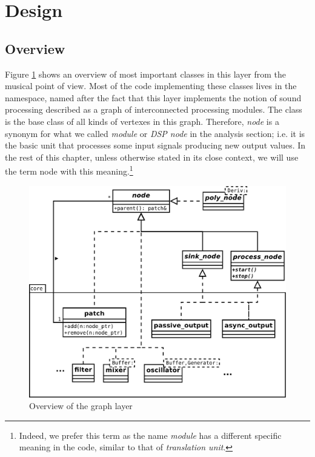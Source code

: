\section{Design}

\subsection{Overview}

Figure \ref{fig:graphoverview} shows an overview of most important
classes in this layer from the musical point of view. Most of the code
implementing these classes lives in the 
namespace, named after the fact that this layer implements the notion
of sound processing described as a graph of interconnected processing
modules. The  class is the base class of all kinds of
vertexes in this graph. Therefore, \emph{node} is a
synonym for what we called \emph{module} or \emph{DSP
  node} in the analysis section; i.e. it is the basic
unit that processes some input signals producing new output values. In
the rest of this chapter, unless otherwise stated in its close
context, we will use the term node with this meaning.\footnote{Indeed,
  we prefer this term as the name \emph{module} has a different
  specific meaning in the code, similar to that of \emph{translation
    unit}.}

\begin{figure}[h]
  \centering
  \includegraphics[width=\textwidth]{pic/graph-node.pdf}
  \caption{Overview of the graph layer}
  \label{fig:graphoverview}
\end{figure}

